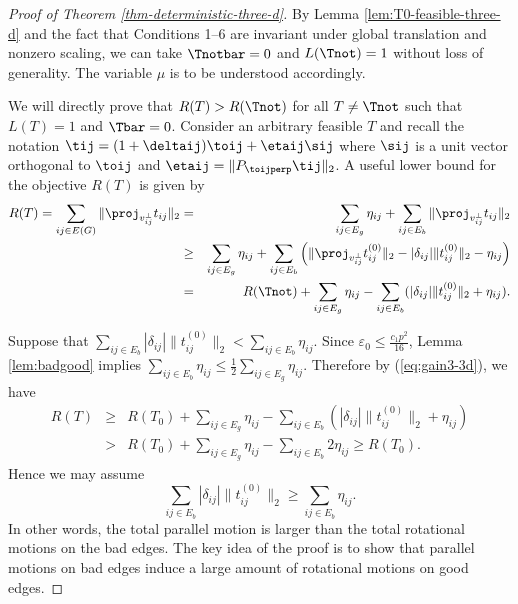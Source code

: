 \begin{proof}[Proof of Theorem \ref{thm-deterministic-three-d}]

By Lemma \ref{lem:T0-feasible-three-d} and the fact that Conditions 1--6 are invariant under global translation and nonzero scaling, we can take $\Tnotbar=0$ and $L(\Tnot) = 1$ without loss of generality.  The variable $\mu$ is to be understood accordingly.  

We will directly prove that $R(T) > R(\Tnot)$ for all $T\neq \Tnot$ such that $L(T)=1$ and $\Tbar = 0$. Consider an arbitrary feasible $T$ and recall the notation $\tij = (1 + \deltaij) \toij + \etaij \sij$ where $\sij$ is a unit vector orthogonal to $\toij$ and $\etaij = \| P_{\toijperp} \tij \|_2$. A useful lower bound for the objective $R(T)$ is given by 
\begin{eqnarray}
	R(T)
	=\sum_{ij \in E(G)}\|\proj_{v_{ij}^{\perp}}t_{ij}\| _2
	& = & \sum_{ij\in E_{g}}\eta_{ij}+\sum_{ij\in E_{b}}\|\proj_{v_{ij}^{\perp}}t_{ij}\|_2\nonumber \\
	& \ge & \sum_{ij\in E_{g}}\eta_{ij}+\sum_{ij\in E_{b}}\left(\|\proj_{v_{ij}^{\perp}}t_{ij}^{(0)}\|_2-|\delta_{ij}|\|t_{ij}^{(0)}\|_2-\eta_{ij}\right)\nonumber \\
	& = & R(\Tnot)+\sum_{ij\in E_{g}}\eta_{ij}-\sum_{ij\in E_{b}}(|\delta_{ij}|\|t_{ij}^{(0)}\|_2+\eta_{ij}).\label{eq:gain3-3d}
\end{eqnarray}

Suppose that $\sum_{ij\in E_{b}}|\delta_{ij}|\|t_{ij}^{(0)}\|_2<\sum_{ij\in E_{b}}\eta_{ij}$.
Since $\varepsilon_0 \le\frac{c_{1}p^{2}}{16}$, Lemma \ref{lem:badgood}
implies $\sum_{ij\in E_{b}}\eta_{ij}\le\frac{1}{2}\sum_{ij\in E_{g}}\eta_{ij}$.
Therefore by (\ref{eq:gain3-3d}), we have
\begin{eqnarray*}
R(T) & \ge & R(T_{0})+\sum_{ij\in E_{g}}\eta_{ij}-\sum_{ij\in E_{b}}(|\delta_{ij}|\|t_{ij}^{(0)}\|_2+\eta_{ij})\\
 & > & R(T_{0})+\sum_{ij\in E_{g}}\eta_{ij}-\sum_{ij\in E_{b}}2\eta_{ij}\ge R(T_{0}).
\end{eqnarray*}
Hence we may assume 
\begin{equation}
\sum_{ij\in E_{b}}|\delta_{ij}|\|t_{ij}^{(0)}\|_2\ge\sum_{ij\in E_{b}}\eta_{ij}.\label{eq:badtwist-3d}
\end{equation}
In other words, the total parallel motion is larger than the total rotational
motions on the bad edges. The key idea of the proof is to show that
parallel motions on bad edges induce a large amount of rotational motions
on good edges. 


\end{proof}
